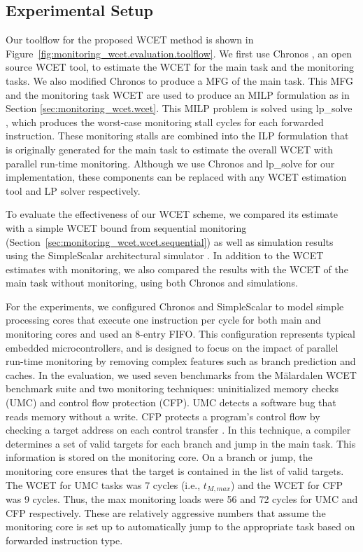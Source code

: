 \subsection{Experimental Setup}

Our toolflow for the proposed WCET method is shown in
Figure~\ref{fig:monitoring_wcet.evaluation.toolflow}. We first use Chronos
\cite{chronos-tool}, an open source WCET tool, to estimate the WCET for the
main task and the monitoring tasks. We also modified Chronos to produce a MFG
of the main task. This MFG and the monitoring task WCET are used to produce an
MILP formulation as in Section \ref{sec:monitoring_wcet.wcet}. This MILP
problem is solved using lp\_solve \cite{lpsolve}, which produces the worst-case
monitoring stall cycles for each forwarded instruction. These monitoring stalls
are combined into the ILP formulation that is originally generated for the main
task to estimate the overall WCET with parallel run-time monitoring. Although
we use Chronos and lp\_solve for our implementation, these components can be
replaced with any WCET estimation tool and LP solver respectively.

To evaluate the effectiveness of our WCET scheme, we compared its estimate with
a simple WCET bound from sequential monitoring
(Section~\ref{sec:monitoring_wcet.wcet.sequential}) as well as simulation
results using the SimpleScalar architectural simulator \cite{simplescalar}.  In
addition to the WCET estimates with monitoring, we also compared the results
with the WCET of the main task without monitoring, using both Chronos and
simulations. 

For the experiments, we configured Chronos and SimpleScalar to model simple
processing cores that execute one instruction per cycle for both main and
monitoring cores and used an 8-entry FIFO.  This configuration represents
typical embedded microcontrollers, and is designed to focus on the impact of
parallel run-time monitoring by removing complex features such as branch
prediction and caches.  In the evaluation, we used seven benchmarks from the
M\"alardalen WCET benchmark suite \cite{malardalen} and two monitoring
techniques: uninitialized memory checks (UMC) and control flow protection
(CFP).  UMC detects a software bug that reads memory without a write.  CFP
protects a program's control flow by checking a target address on each control
transfer \cite{arora-runtime05}. In this technique, a compiler determines a set
of valid targets for each branch and jump in the main task.  This information
is stored on the monitoring core.  On a branch or jump, the monitoring core
ensures that the target is contained in the list of valid targets.
The WCET for UMC tasks was 7 cycles (i.e., $t_{M,max}$) and the WCET for CFP
was 9 cycles. Thus, the max monitoring loads were 56 and 72 cycles for UMC and
CFP respectively. These are relatively aggressive numbers that assume the
monitoring core is set up to automatically jump to the appropriate task based
on forwarded instruction type.

